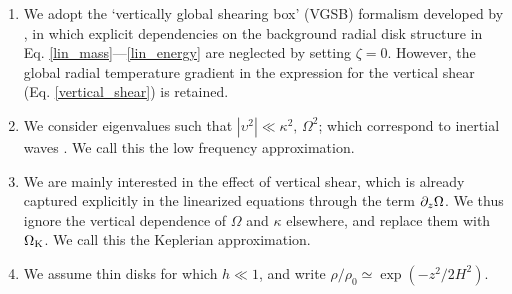 \begin{enumerate}
  
\item  We adopt the  `vertically global shearing box' (VGSB) formalism 
  developed by , in which explicit dependencies on the
  background radial disk structure in 
  Eq. \ref{lin_mass}---\ref{lin_energy} are neglected by setting
  $\zeta=0$. However, the global radial temperature 
  gradient in the expression for the 
  vertical shear (Eq. \ref{vertical_shear}) is retained. 

\item We consider eigenvalues such that
  $|\upsilon^2|\ll \kappa^2,\,\Omega^2$; which correspond to inertial
  waves . We call this the low frequency  
  approximation. 

\item We are mainly interested in the effect of vertical shear, 
  which is already captured
  explicitly in the linearized equations through the term
  $\partial_z\Omega$. We thus ignore the vertical dependence of $\Omega$ and
  $\kappa$ elsewhere, and replace them with
  $\Omega_{\rm K}$.  We call this the Keplerian approximation. 
  
\item We assume thin disks for which $h\ll 1$, and write 
  $\rho/\rho_0\simeq  \exp{(-z^2/2H^2)}$. 

\end{enumerate}

